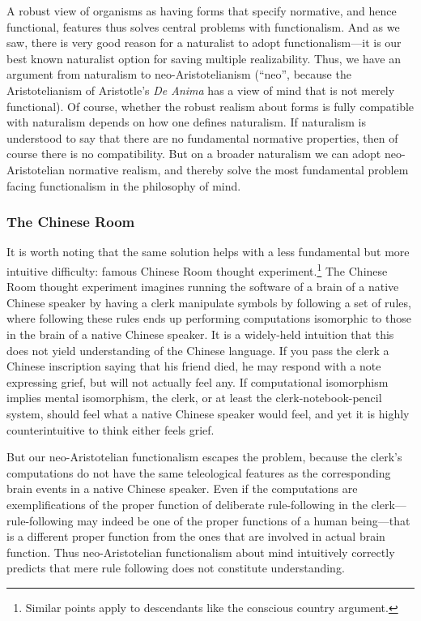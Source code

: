 A robust view of organisms as having forms that specify normative, and hence functional, features thus solves central
problems with functionalism. And as we saw, there is very good reason for a naturalist to adopt functionalism---it is our
best known naturalist option for saving multiple realizability. Thus, we have an argument from naturalism to neo-Aristotelianism (``neo'', because the Aristotelianism of Aristotle's \textit{De Anima} has a view of mind that is not merely functional). Of course, whether the robust realism about forms is fully compatible with naturalism depends
on how one defines naturalism.  If naturalism is understood to say that 
there are no fundamental normative properties, then of course there is no compatibility. But on a broader naturalism we can adopt neo-Aristotelian normative realism, and thereby solve the most fundamental problem facing functionalism
in the philosophy of mind.

\subsubsection{The Chinese Room}
It is worth noting that the same solution helps with a less fundamental but more intuitive difficulty:
 famous Chinese Room thought experiment.\footnote{Similar points apply to descendants 
like the  conscious country
argument.} The Chinese Room thought experiment imagines running the software of a brain of a native Chinese speaker 
by having a clerk manipulate symbols by following a set of rules, where following these rules ends up performing
computations isomorphic to those in the brain of a native Chinese speaker. It is a widely-held intuition that
this does not yield understanding of the Chinese
language. If you pass the clerk a Chinese inscription saying that his friend
died, he may respond with a note expressing grief, but will not actually feel any. If computational isomorphism
implies mental isomorphism, the clerk, or at least the clerk-notebook-pencil system, should feel what a native
Chinese speaker would feel, and yet it is highly counterintuitive to think either feels grief.

But our neo-Aristotelian functionalism escapes the problem, because the clerk's computations do not have 
the same teleological features as the corresponding brain events in a native Chinese speaker. Even if the computations
are exemplifications of the proper function of deliberate rule-following in the clerk---rule-following may 
indeed be one of the proper functions of a human being---that is a different proper function from the ones that 
are involved in actual brain function. Thus neo-Aristotelian functionalism about mind intuitively correctly predicts that
mere rule following does not constitute understanding.

